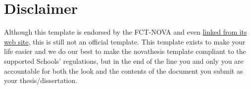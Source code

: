 \section{Disclaimer}
\label{sec:disclaimer}

Although this template is endorsed by the FCT-NOVA and even \href{https://www.fct.unl.pt/estudante/informacao-academica}{linked from its web site}, this is still not an official template.
%
This template exists to make your life easier and we do our best to make the \gls{novathesis} template compliant to the supported Schools' regulations, but in the end of the line you and only you are accountable for both the look and the contents of the document you submit as your thesis/dissertation.

